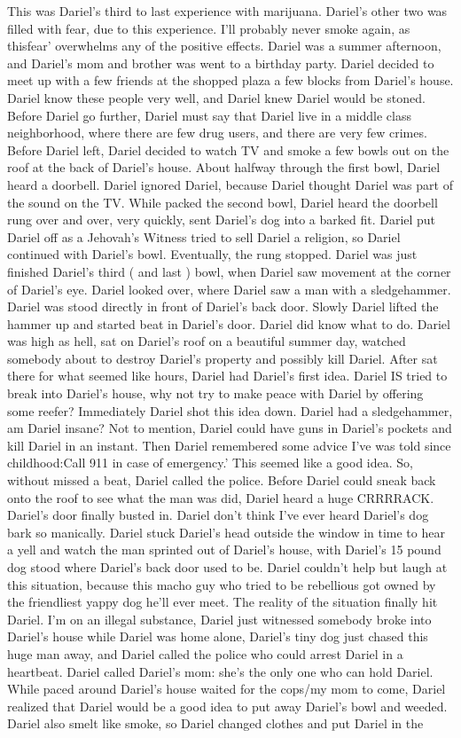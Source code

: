 \documentclass[12pt]{book}
\begin{document}
This was Dariel's third to last experience with marijuana. Dariel's other two was filled with fear, due to this experience. I'll probably never smoke again, as thisfear' overwhelms any of the positive effects. Dariel was a summer afternoon, and Dariel's mom and brother was went to a birthday party. Dariel decided to meet up with a few friends at the shopped plaza a few blocks from Dariel's house. Dariel know these people very well, and Dariel knew Dariel would be stoned. Before Dariel go further, Dariel must say that Dariel live in a middle class neighborhood, where there are few drug users, and there are very few crimes. Before Dariel left, Dariel decided to watch TV and smoke a few bowls out on the roof at the back of Dariel's house. About halfway through the first bowl, Dariel heard a doorbell. Dariel ignored Dariel, because Dariel thought Dariel was part of the sound on the TV. While packed the second bowl, Dariel heard the doorbell rung over and over, very quickly, sent Dariel's dog into a barked fit. Dariel put Dariel off as a Jehovah's Witness tried to sell Dariel a religion, so Dariel continued with Dariel's bowl. Eventually, the rung stopped. Dariel was just finished Dariel's third ( and last ) bowl, when Dariel saw movement at the corner of Dariel's eye. Dariel looked over, where Dariel saw a man with a sledgehammer. Dariel was stood directly in front of Dariel's back door. Slowly Dariel lifted the hammer up and started beat in Dariel's door. Dariel did know what to do. Dariel was high as hell, sat on Dariel's roof on a beautiful summer day, watched somebody about to destroy Dariel's property and possibly kill Dariel. After sat there for what seemed like hours, Dariel had Dariel's first idea. Dariel IS tried to break into Dariel's house, why not try to make peace with Dariel by offering some reefer? Immediately Dariel shot this idea down. Dariel had a sledgehammer, am Dariel insane? Not to mention, Dariel could have guns in Dariel's pockets and kill Dariel in an instant. Then Dariel remembered some advice I've was told since childhood:Call 911 in case of emergency.' This seemed like a good idea. So, without missed a beat, Dariel called the police. Before Dariel could sneak back onto the roof to see what the man was did, Dariel heard a huge CRRRRACK. Dariel's door finally busted in. Dariel don't think I've ever heard Dariel's dog bark so manically. Dariel stuck Dariel's head outside the window in time to hear a yell and watch the man sprinted out of Dariel's house, with Dariel's 15 pound dog stood where Dariel's back door used to be. Dariel couldn't help but laugh at this situation, because this macho guy who tried to be rebellious got owned by the friendliest yappy dog he'll ever meet. The reality of the situation finally hit Dariel. I'm on an illegal substance, Dariel just witnessed somebody broke into Dariel's house while Dariel was home alone, Dariel's tiny dog just chased this huge man away, and Dariel called the police who could arrest Dariel in a heartbeat. Dariel called Dariel's mom: she's the only one who can hold Dariel. While paced around Dariel's house waited for the cops/my mom to come, Dariel realized that Dariel would be a good idea to put away Dariel's bowl and weeded. Dariel also smelt like smoke, so Dariel changed clothes and put Dariel in the 
\end{document}
